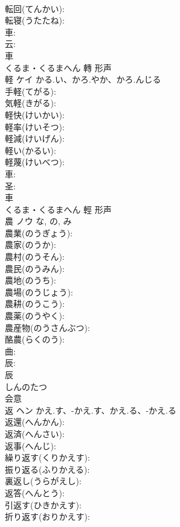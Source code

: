 \documentclass[8pt]{extreport}
\begin{document}
\begin{CJK}{UTF8}{min}
\\	転回(てんかい): 
\\	転寝(うたたね): 
\\	車: 
\\	云: 
\\	車	
\\	くるま・くるまへん	轉	形声 
\\	軽	ケイ	かる.い、かろ.やか、かろ.んじる		
\\	手軽(てがる): 
\\	気軽(きがる): 
\\	軽快(けいかい): 
\\	軽率(けいそつ): 
\\	軽減(けいげん): 
\\	軽い(かるい): 
\\	軽蔑(けいべつ): 
\\	車: 
\\	圣: 
\\	車	
\\	くるま・くるまへん	輕	形声 
\\	農	ノウ		な, の, み	
\\	農業(のうぎょう): 
\\	農家(のうか): 
\\	農村(のうそん): 
\\	農民(のうみん): 
\\	農地(のうち): 
\\	農場(のうじょう): 
\\	農耕(のうこう): 
\\	農薬(のうやく): 
\\	農産物(のうさんぶつ): 
\\	酪農(らくのう): 
\\	曲: 
\\	辰: 
\\	辰	
\\	しんのたつ	
\\	会意 
\\	返	ヘン	かえ.す、-かえ.す、かえ.る、-かえ.る		
\\	返還(へんかん): 
\\	返済(へんさい): 
\\	返事(へんじ): 
\\	繰り返す(くりかえす): 
\\	振り返る(ふりかえる): 
\\	裏返し(うらがえし): 
\\	返答(へんとう): 
\\	引返す(ひきかえす): 
\\	折り返す(おりかえす): 

\end{CJK}
\end{document}
